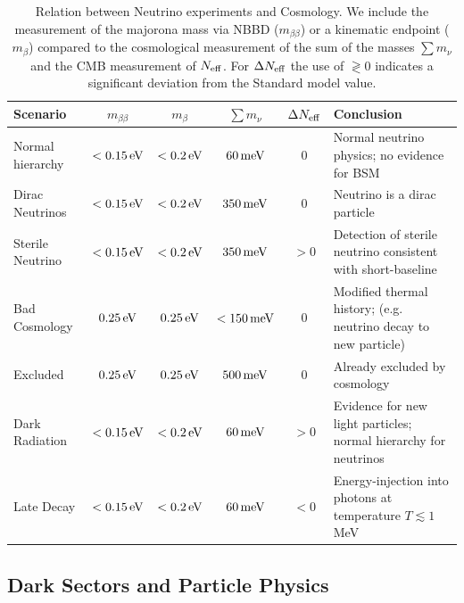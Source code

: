 \begin{table}[t!]
\begin{center}
\begin{tabular}
{| l | c c c c | p{5cm} | }\hline Scenario & $m_{\beta \beta}$ & $m_{\beta}$&  $\sum m_\nu$ & $\Delta N_{\rm eff}$ & Conclusion \\
\hline 
Normal hierarchy & $< 0.15 \, {\rm eV}$ & $< 0.2 \,  {\rm eV}$  & $60 \, {\rm meV}$ & 0 & Normal neutrino physics; no evidence for BSM
\\  
Dirac Neutrinos & $< 0.15 \, {\rm eV}$ & $ <0.2 \, {\rm eV}$  & $350  \, {\rm meV}$ & 0 & Neutrino is a dirac particle \\
Sterile Neutrino & $< 0.15 \, {\rm eV}$ & $ <0.2 \, {\rm eV}$   & $350  \, {\rm meV}$ & $>0$ & Detection of sterile neutrino consistent with short-baseline \\
\hline
Bad Cosmology & $ 0.25 \, {\rm eV}$ & $ 0.25 \, {\rm eV}$  & $<150  \, {\rm meV}$ & $0$ & Modified thermal history; (e.g. neutrino decay to new particle) \\
Excluded & $ 0.25 \, {\rm eV}$ & $ 0.25 \, {\rm eV}$  & $500  \, {\rm meV}$ & $0$ & Already excluded by cosmology \\
\hline
Dark Radiation & $< 0.15 \, {\rm eV}$ & $ <0.2 \, {\rm eV}$  & $60  \, {\rm meV}$ & $>0$ & Evidence for new light particles; normal hierarchy for neutrinos
\\  
Late Decay & $< 0.15 \, {\rm eV}$ & $ <0.2 \, {\rm eV}$  & $60  \, {\rm meV}$ & $<0$ & Energy-injection into photons at temperature $T \lesssim 1$ MeV \\
\hline 
\end{tabular}
\caption{Relation between Neutrino experiments and Cosmology.  We include the measurement of the majorona mass via NBBD ($m_{\beta \beta}$) or a kinematic endpoint ($m_\beta$) compared to the cosmological measurement of the sum of the masses $\sum m_\nu$ and the CMB measurement of $N_{\rm eff}$.  For $\Delta N_{\rm eff}$ the use of $\gtrless 0$ indicates a significant deviation from the Standard model value.}
\label{table:neutrinoscenarios}
\end{center}
\end{table} 

\subsection{Dark Sectors and Particle Physics}

